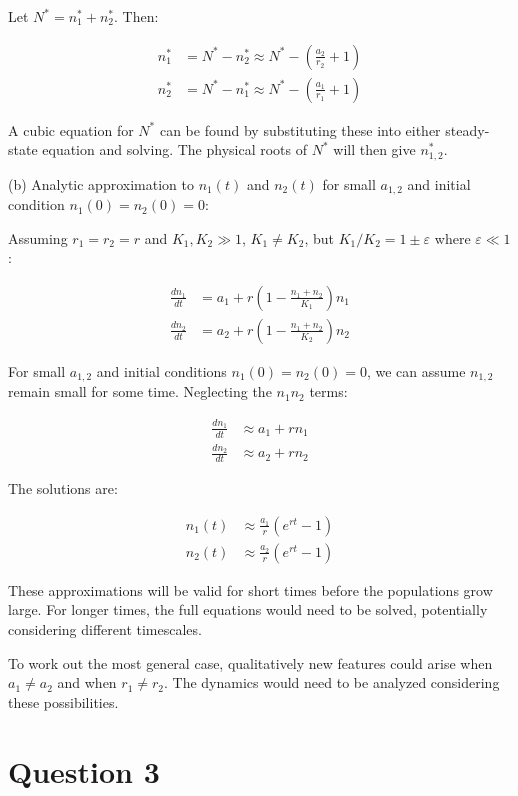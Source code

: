 \documentclass{article}
\begin{document}
Let $N^* = n^*_1 + n^*_2$. Then:

\begin{align*}
n^*_1 &= N^* - n^*_2 \approx N^* - \left(\frac{a_2}{r_2} + 1\right) \\
n^*_2 &= N^* - n^*_1 \approx N^* - \left(\frac{a_1}{r_1} + 1\right)
\end{align*}

A cubic equation for $N^*$ can be found by substituting these into either steady-state equation and solving. The physical roots of $N^*$ will then give $n^*_{1,2}$.

(b) Analytic approximation to $n_1(t)$ and $n_2(t)$ for small $a_{1,2}$ and initial condition $n_1(0) = n_2(0) = 0$:

Assuming $r_1 = r_2 = r$ and $K_1, K_2 \gg 1$, $K_1 \neq K_2$, but $K_1/K_2 = 1 \pm \varepsilon$ where $\varepsilon \ll 1$:

\begin{align*}
\frac{dn_1}{dt} &= a_1 + r\left(1 - \frac{n_1 + n_2}{K_1}\right)n_1 \\
\frac{dn_2}{dt} &= a_2 + r\left(1 - \frac{n_1 + n_2}{K_2}\right)n_2
\end{align*}

For small $a_{1,2}$ and initial conditions $n_1(0) = n_2(0) = 0$, we can assume $n_{1,2}$ remain small for some time. Neglecting the $n_1n_2$ terms:

\begin{align*}
\frac{dn_1}{dt} &\approx a_1 + rn_1 \\
\frac{dn_2}{dt} &\approx a_2 + rn_2
\end{align*}

The solutions are:

\begin{align*}
n_1(t) &\approx \frac{a_1}{r}(e^{rt} - 1) \\
n_2(t) &\approx \frac{a_2}{r}(e^{rt} - 1)
\end{align*}

These approximations will be valid for short times before the populations grow large. For longer times, the full equations would need to be solved, potentially considering different timescales.

To work out the most general case, qualitatively new features could arise when $a_1 \neq a_2$ and when $r_1 \neq r_2$. The dynamics would need to be analyzed considering these possibilities.

\section{Question 3}
\end{document}
